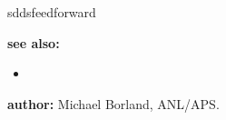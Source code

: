 \begin{sddsprog}{sddsfeedforward}
\item \textbf{see also:}
\begin{itemize}
  \item {}
\end{itemize}
\item \textbf{author:} Michael Borland, ANL/APS.
\end{sddsprog}
